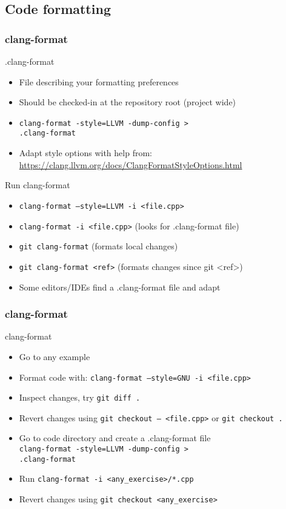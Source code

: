 \subsection[format]{Code formatting}

\begin{frame}[fragile]
\frametitle{clang-format}
\begin{block}{.clang-format}
	\begin{itemize}
		\item File describing your formatting preferences
		\item Should be checked-in at the repository root (project wide)
		\item \texttt{clang-format -style=LLVM -dump-config >} \\
		  \texttt{.clang-format}
		\item Adapt style options with help from: \url{https://clang.llvm.org/docs/ClangFormatStyleOptions.html}
	\end{itemize}
\end{block}
\begin{block}{Run clang-format}
	\begin{itemize}
		\item \texttt{clang-format --style=LLVM -i <file.cpp>}
		\item \texttt{clang-format -i <file.cpp>} (looks for .clang-format file)
		\item \texttt{git clang-format} (formats local changes)
		\item \texttt{git clang-format <ref>} (formats changes since git \textless{}ref\textgreater{})
		\item Some editors/IDEs find a .clang-format file and adapt
	\end{itemize}
\end{block}
\end{frame}

\begin{frame}[fragile]
\frametitle{clang-format}
\begin{exercise}{clang-format}
	\begin{itemize}
		\item Go to any example
		\item Format code with: \texttt{clang-format --style=GNU -i <file.cpp>}
		\item Inspect changes, try \texttt{git diff .}
		\item Revert changes using \texttt{git checkout -- <file.cpp>} or \texttt{git checkout .}
		\item Go to code directory and create a .clang-format file \\
		  \texttt{clang-format -style=LLVM -dump-config >} \\
		  \texttt{.clang-format}
		\item Run \texttt{clang-format -i <any_exercise>/*.cpp}
		\item Revert changes using \texttt{git checkout <any_exercise>}
	\end{itemize}
\end{exercise}
\end{frame}
